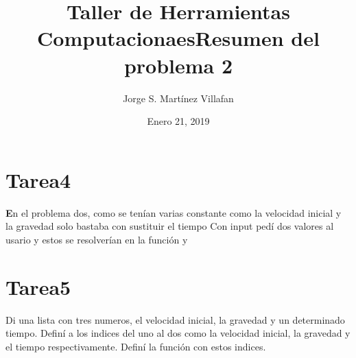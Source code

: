 \documentclass[letterpaper, 12pt, oneside]{article}%
\title{\Huge Taller de Herramientas Computacionaes}
\author{Jorge S. Martínez Villafan}
\date{Enero 21, 2019}
\begin{document}
\maketitle
\newpage
\title{Resumen del problema 2}
\section{Tarea4}
\textbf En el problema dos, como se tenían varias constante como la velocidad inicial y la gravedad solo bastaba con sustituir el tiempo Con input pedí dos valores al usario y estos se resolverían en la función y 

\section{Tarea5}
Di una lista con tres numeros, el velocidad inicial, la gravedad y un determinado tiempo. Definí a los indices del uno al dos como la velocidad inicial, la gravedad y el tiempo respectivamente. Definí la función con estos indices. 
\end{document}

